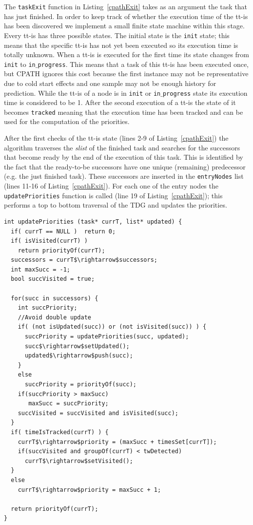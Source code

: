 The \texttt{taskExit} function in Listing~\ref{cpathExit} takes as an argument the task that has just finished. 
In order to keep track of whether the execution time of the tt-is has been discovered we implement a small finite state machine within this stage.
Every tt-is has three possible states. 
The initial state is the \texttt{init} state; this means that the specific tt-is has not yet been executed so its execution time is totally unknown.
When a tt-is is executed for the first time its state changes from \texttt{init} to 
\texttt{in$\_$progress}. 
This means that a task of this tt-is has been executed once, but CPATH ignores this cost because the first instance may not be representative due to cold start effects and one sample may not be enough history for prediction.
While the tt-is of a node is in \texttt{init} or \texttt{in$\_$progress} state its execution time is considered to be 1.
After the second execution of a tt-is the state of it becomes \texttt{tracked} meaning that the execution time has been tracked and can be used for the computation of the priorities.

After the first checks of the tt-is state (lines 2-9 of Listing~\ref{cpathExit}) the algorithm traverses the \textit{slist} of the finished task and searches for the successors that become ready by the end of the execution of this task.
This is identified by the fact that the ready-to-be successors have one unique (remaining) predecessor (e.g. the just finished task).
These successors are inserted in the \texttt{entryNodes} list (lines 11-16 of Listing~\ref{cpathExit}).
For each one of the entry nodes the \texttt{updatePriorities} function is called (line 19 of Listing~\ref{cpathExit}); this performs a top to bottom traversal of the TDG and updates the priorities.

\begin{lstlisting}[float, emph={updatePriorities,non_critical_queue, critical_queue,submit_task}, caption={Pseudo-code for task prioritization with CPATH},label=cpathUpdate]
int updatePriorities (task* currT, list* updated) {
  if( currT == NULL )  return 0;
  if( isVisited(currT) )  
    return priorityOf(currT);
  successors = currT$\rightarrow$successors;
  int maxSucc = -1;
  bool succVisited = true;
  
  for(succ in successors) {
    int succPriority;
    //Avoid double update
    if( (not isUpdated(succ)) or (not isVisited(succ)) ) {
      succPriority = updatePriorities(succ, updated);
      succ$\rightarrow$setUpdated();
      updated$\rightarrow$push(succ);
    }
    else 
      succPriority = priorityOf(succ);
    if(succPriority > maxSucc)
       maxSucc = succPriority;
    succVisited = succVisited and isVisited(succ);   
  }
  if( timeIsTracked(currT) ) {
    currT$\rightarrow$priority = (maxSucc + timesSet[currT]);
    if(succVisited and groupOf(currT) < twDetected) 
      currT$\rightarrow$setVisited();
  }  
  else
    currT$\rightarrow$priority = maxSucc + 1;
    
  return priorityOf(currT);  
}
\end{lstlisting}

